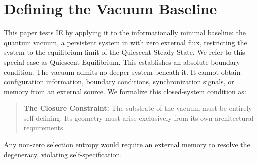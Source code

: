 \section{Defining the Vacuum Baseline}
\label{sec:the_test_case}
This paper tests IE by applying it to the informationally minimal baseline: the quantum vacuum, a persistent system in with zero external flux, restricting the system to the equilibrium limit of the Quiescent Steady State. We refer to this special case as Quiescent Equilibrium. This establishes an absolute boundary condition. The vacuum admits no deeper system beneath it. It cannot obtain configuration information, boundary conditions, synchronization signals, or memory from an external source. We formalize this closed-system condition as:
\begin{quote}
\textbf{The Closure Constraint:} The substrate of the vacuum must be entirely self-defining. Its geometry must arise exclusively from its own architectural requirements.
\end{quote}
Any non-zero selection entropy would require an external memory to resolve the degeneracy, violating self-specification.
\label{subsec:closure}